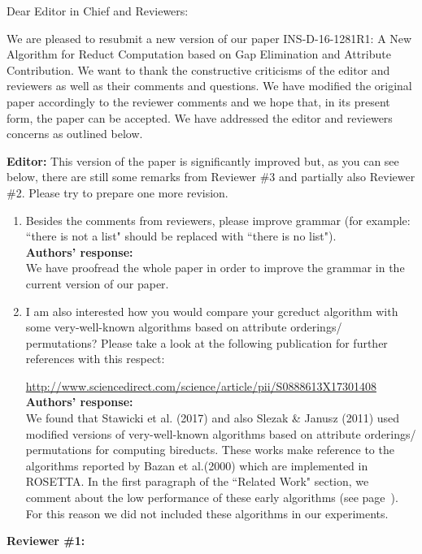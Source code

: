 \documentclass{letter}
\begin{document}
\begin{letter}{}
  \opening{Dear Editor in Chief and Reviewers:}

  We are pleased to resubmit a new version of our paper INS-D-16-1281R1: A New Algorithm for Reduct Computation based on Gap Elimination and Attribute Contribution. We want to thank the constructive criticisms of the editor and reviewers as well as their comments and questions. We have modified the original paper accordingly to the reviewer comments and we hope that, in its present form, the paper can be accepted. We have addressed the editor and reviewers concerns as outlined below.

  \textbf{Editor:} 
  This version of the paper is significantly improved but, as you can see below, there are still some remarks from Reviewer \#3 and partially also Reviewer \#2. Please try to prepare one more revision.
  \begin{enumerate}
	\item Besides the comments from reviewers, please improve grammar (for example: ``there is not a list" should be replaced with ``there is no list"). \\
	\textbf{Authors’ response:} \\
	We have proofread the whole paper in order to improve the grammar in the current version of our paper.
		 
	\item I am also interested how you would compare your gcreduct algorithm with some very-well-known algorithms based on attribute orderings/ permutations? Please take a look at the following publication for further references with this respect:
  
	\small{\url{ http://www.sciencedirect.com/science/article/pii/S0888613X17301408}}\\
	\normalsize
	\textbf{Authors’ response:} \\
	We found that Stawicki et al. (2017) and also Slezak \& Janusz (2011) used modified versions of very-well-known algorithms based on attribute orderings/ permutations for computing bireducts. These works make reference to the algorithms reported by Bazan et al.(2000) which are implemented in ROSETTA. In the first paragraph of the ``Related Work" section, we comment about the low performance of these early algorithms (see page~\pageref{early}). For this reason we did not included these algorithms in our experiments.
  \end{enumerate}
  
  \textbf{Reviewer \#1:}
  

\end{letter}
\end{document}
